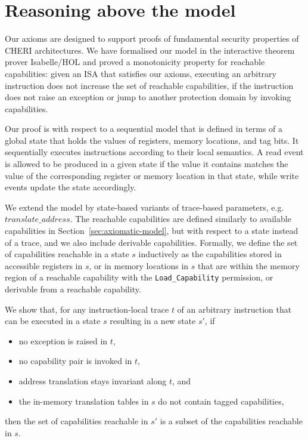 \documentclass[11pt]{article}
\theoremstyle{definition}
\newcommand{\TODO}[1]{{\color{blue}[TODO: #1]}}
\begin{document}



\section{Reasoning above the model}
\label{sec:proof}

Our axioms are designed to support proofs of fundamental security properties of
CHERI architectures.  We have formalised our model in the interactive theorem
prover Isabelle/HOL and proved a monotonicity property for reachable
capabilities: given an ISA that satisfies our axioms, executing an arbitrary
instruction does not increase the set of reachable capabilities, if the
instruction does not raise an exception or jump to another protection domain
by invoking capabilities.

Our proof is with respect to a sequential model that is defined in terms of a
global state that holds the values of registers, memory locations, and tag
bits.  It sequentially executes instructions according to their local
semantics.  A read event is allowed to be produced in a given state if the
value it contains matches the value of the corresponding register or memory
location in that state, while write events update the state accordingly.

We extend the model by state-based variants of trace-based parameters,
e.g.~$\mathit{translate\_address}$.  The reachable capabilities are defined
similarly to available capabilities in Section~\ref{sec:axiomatic-model}, but
with respect to a state instead of a trace, and we also include derivable
capabilities.  Formally, we define the set of capabilities reachable in a state
$s$ inductively as the capabilities stored in accessible registers in $s$, or
in memory locations in $s$ that are within the memory region of a reachable
capability with the \texttt{Load\_Capability} permission, or derivable from a
reachable capability.

We show that, for any instruction-local trace $t$ of an arbitrary instruction
that can be executed in a state $s$ resulting in a new state $s'$, if
\begin{itemize}
\item no exception is raised in $t$,
\item no capability pair is invoked in $t$,
\item address translation stays invariant along $t$, and
\item the in-memory translation tables in $s$ do not contain tagged capabilities,
\end{itemize}
then the set of capabilities reachable in $s'$ is a subset of the capabilities
reachable in $s$.
\end{document}

